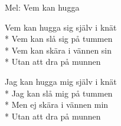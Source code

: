 \begin{SongText}
    \begin{SongInfo}
        Mel: Vem kan hugga
    \end{SongInfo}
    \begin{SongVerse}
        Vem kan hugga sig själv i knät\\*%
        Vem kan slå sig på tummen\\*%
        Vem kan skära i vännen sin\\*%
        Utan att dra på munnen
    \end{SongVerse}
    \begin{SongVerse}
        Jag kan hugga mig själv i knät\\*%
        Jag kan slå mig på tummen\\*%
        Men ej skära i vännen min\\*%
        Utan att dra på munnen
    \end{SongVerse}
\end{SongText}
